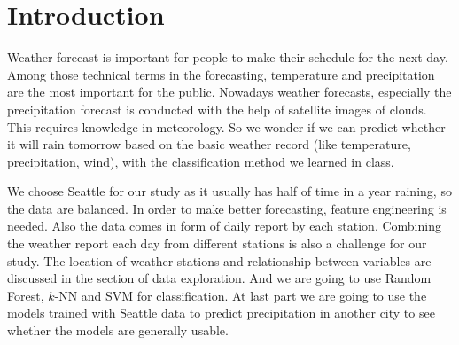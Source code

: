 \section{Introduction}

Weather forecast is important for people to make their schedule for the next day. Among those technical terms in the forecasting, temperature and precipitation are the most important for the public. Nowadays weather forecasts, especially the precipitation forecast is conducted with the help of satellite images of clouds. This requires knowledge in meteorology. So we wonder if we can predict whether it will rain tomorrow based on the basic weather record (like temperature, precipitation, wind), with the classification method we learned in class.

We choose Seattle for our study as it usually has half of time in a year raining, so the data are balanced. In order to make better forecasting, feature engineering is needed. Also the data comes in form of daily report by each station. Combining the weather report each day from different stations is also a challenge for our study.  The location of weather stations and relationship between variables are discussed in the section of data exploration. And we are going to use Random Forest, $k$-NN and SVM for classification. At last part we are going to use the models trained with Seattle data to predict precipitation in another city to see whether the models are generally usable.